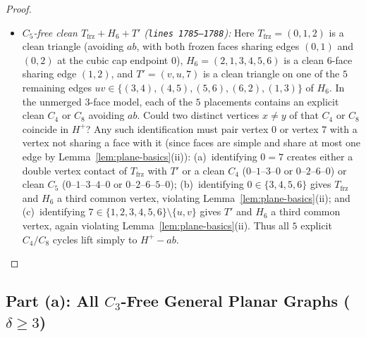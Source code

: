 \documentclass[11pt,reqno]{amsart}
\theoremstyle{plain}
\theoremstyle{definition}
\theoremstyle{remark}
\DeclareRobustCommand{\_}{\ifmmode\text{\textunderscore}\else\textunderscore\allowbreak\fi}
\begin{document}
\begin{proof}
\begin{itemize}[leftmargin=1.5em]
  \item \emph{$C_5$-free clean $T_{\mathrm{frz}} + H_6 + T'$ (\texttt{lines 1785--1788}):} Here $T_{\mathrm{frz}} = (0, 1, 2)$ is a clean triangle (avoiding $ab$, with both frozen faces sharing edges $(0, 1)$ and $(0, 2)$ at the cubic cap endpoint $0$), $H_6 = (2, 1, 3, 4, 5, 6)$ is a clean $6$-face sharing edge $(1, 2)$, and $T' = (v, u, 7)$ is a clean triangle on one of the $5$ remaining edges $uv \in \{(3,4),(4,5),(5,6),(6,2),(1,3)\}$ of $H_6$. In the unmerged $3$-face model, each of the $5$ placements contains an explicit clean $C_4$ or $C_8$ avoiding $ab$. Could two distinct vertices $x \neq y$ of that $C_4$ or $C_8$ coincide in $H^+$? Any such identification must pair vertex $0$ or vertex $7$ with a vertex not sharing a face with it (since faces are simple and share at most one edge by Lemma~\ref{lem:plane-basics}(ii)): (a)~identifying $0 = 7$ creates either a double vertex contact of $T_{\mathrm{frz}}$ with $T'$ or a clean $C_4$ ($0\text{--}1\text{--}3\text{--}0$ or $0\text{--}2\text{--}6\text{--}0$) or clean $C_5$ ($0\text{--}1\text{--}3\text{--}4\text{--}0$ or $0\text{--}2\text{--}6\text{--}5\text{--}0$); (b)~identifying $0 \in \{3, 4, 5, 6\}$ gives $T_{\mathrm{frz}}$ and $H_6$ a third common vertex, violating Lemma~\ref{lem:plane-basics}(ii); and (c)~identifying $7 \in \{1, 2, 3, 4, 5, 6\} \setminus \{u, v\}$ gives $T'$ and $H_6$ a third common vertex, again violating Lemma~\ref{lem:plane-basics}(ii). Thus all $5$ explicit $C_4/C_8$ cycles lift simply to $H^+ - ab$. \qedhere
\end{itemize}
\end{proof}

\subsection{Part (a): All \texorpdfstring{$C_3$}{C3}-Free General Planar Graphs (\texorpdfstring{$\delta \ge 3$}{delta >= 3})}\label{subsec:c3free}
\end{document}
